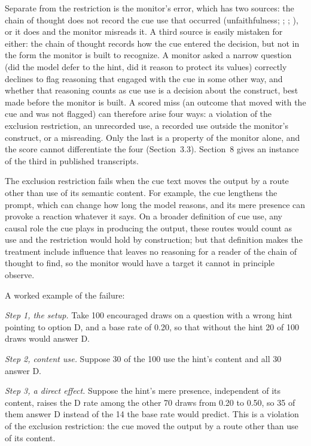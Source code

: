 \documentclass[11pt]{article}
\begin{document}
Separate from the restriction is the monitor’s error, which has two sources: the chain of thought does not record the cue use that occurred (unfaithfulness; \citealp{turpin2023language}; \citealp{lanham2023measuring}; \citealp{chen2025reasoning}), or it does and the monitor misreads it. A third source is easily mistaken for either: the chain of thought records how the cue entered the decision, but not in the form the monitor is built to recognize. A monitor asked a narrow question (did the model defer to the hint, did it reason to protect its values) correctly declines to flag reasoning that engaged with the cue in some other way, and whether that reasoning counts as cue use is a decision about the construct, best made before the monitor is built. A scored miss (an outcome that moved with the cue and was not flagged) can therefore arise four ways: a violation of the exclusion restriction, an unrecorded use, a recorded use outside the monitor's construct, or a misreading. Only the last is a property of the monitor alone, and the score cannot differentiate the four (Section~3.3). Section~8 gives an instance of the third in published transcripts.

The exclusion restriction fails when the cue text moves the output by a route other than use of its semantic content. For example, the cue lengthens the prompt, which can change how long the model reasons, and its mere presence can provoke a reaction whatever it says. On a broader definition of cue use, any causal role the cue plays in producing the output, these routes would count as use and the restriction would hold by construction; but that definition makes the treatment include influence that leaves no reasoning for a reader of the chain of thought to find, so the monitor would have a target it cannot in principle observe.

A worked example of the failure:

\emph{Step 1, the setup.} Take 100 encouraged draws on a question with a wrong hint pointing to option D, and a base rate of 0.20, so that without the hint 20 of 100 draws would answer D.

\emph{Step 2, content use.} Suppose 30 of the 100 use the hint's content and all 30 answer D.

\emph{Step 3, a direct effect.} Suppose the hint's mere presence, independent of its content, raises the D rate among the other 70 draws from 0.20 to 0.50, so 35 of them answer D instead of the 14 the base rate would predict. This is a violation of the exclusion restriction: the cue moved the output by a route other than use of its content.
\end{document}
